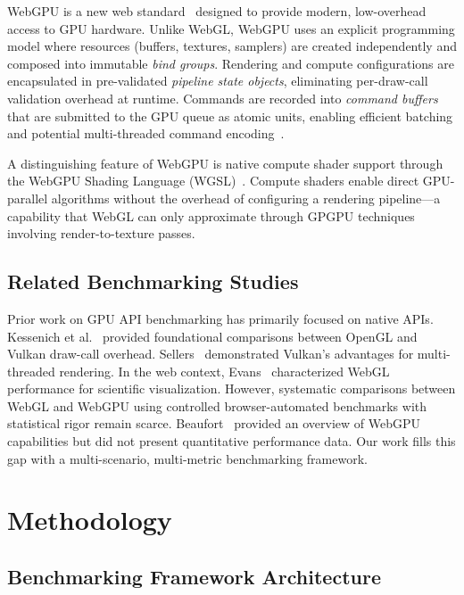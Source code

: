 \documentclass[conference]{IEEEtran}
\begin{document}
WebGPU is a new web standard~\cite{w3c2024webgpu} designed to provide modern, low-overhead access to GPU hardware. Unlike WebGL, WebGPU uses an explicit programming model where resources (buffers, textures, samplers) are created independently and composed into immutable \textit{bind groups}. Rendering and compute configurations are encapsulated in pre-validated \textit{pipeline state objects}, eliminating per-draw-call validation overhead at runtime. Commands are recorded into \textit{command buffers} that are submitted to the GPU queue as atomic units, enabling efficient batching and potential multi-threaded command encoding~\cite{beaufort2023webgpu}.

A distinguishing feature of WebGPU is native compute shader support through the WebGPU Shading Language (WGSL)~\cite{w3c2024wgsl}. Compute shaders enable direct GPU-parallel algorithms without the overhead of configuring a rendering pipeline---a capability that WebGL can only approximate through GPGPU techniques involving render-to-texture passes.

\subsection{Related Benchmarking Studies}

Prior work on GPU API benchmarking has primarily focused on native APIs. Kessenich et al.~\cite{kessenich2018opengl} provided foundational comparisons between OpenGL and Vulkan draw-call overhead. Sellers~\cite{sellers2016vulkan} demonstrated Vulkan's advantages for multi-threaded rendering. In the web context, Evans~\cite{evans2014webgl} characterized WebGL performance for scientific visualization. However, systematic comparisons between WebGL and WebGPU using controlled browser-automated benchmarks with statistical rigor remain scarce. Beaufort~\cite{beaufort2023webgpu} provided an overview of WebGPU capabilities but did not present quantitative performance data. Our work fills this gap with a multi-scenario, multi-metric benchmarking framework.

\section{Methodology}
\label{sec:methodology}

\subsection{Benchmarking Framework Architecture}
\end{document}
